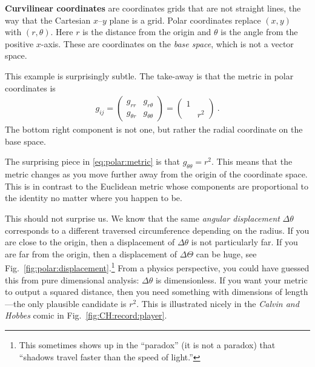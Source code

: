 \documentclass[12pt, oneside]{report}    %
\begin{document}
\textbf{Curvilinear coordinates} are coordinates grids that are not straight lines, the way that the Cartesian $x$--$y$ plane is a grid. Polar coordinates replace $(x,y)$ with $(r,\theta)$. Here $r$ is the distance from the origin and $\theta$ is the angle from the positive $x$-axis. These are coordinates on the \emph{base space}, which is not a vector space.
 
This example is surprisingly subtle. The take-away is that the metric in polar coordinates is
\begin{align}
    g_{ij} = 
    \begin{pmatrix}
        g_{rr} & g_{r\theta} \\
        g_{\theta r} & g_{\theta\theta}    
    \end{pmatrix}
    =
    \begin{pmatrix}
        1 & \\
        & r^2
    \end{pmatrix} \ .
    \label{eq:polar:metric}
\end{align}
The bottom right component is not one, but rather the radial coordinate on the base space. 

The surprising piece in \eqref{eq:polar:metric} is that $g_{\theta\theta} = r^2$. This means that the metric changes as you move further away from the origin of the coordinate space. This is in contrast to the Euclidean metric whose components are proportional to the identity no matter where you happen to be.

This should not surprise us. We know that the same \emph{angular displacement} $\Delta \theta$ corresponds to a different traversed circumference depending on the radius. If you are close to the origin, then a displacement of $\Delta\theta$ is not particularly far. If you are far from the origin, then a displacement of $\Delta\Theta$ can be huge, see Fig.~\ref{fig:polar:displacement}.\footnote{This sometimes shows up in the ``paradox'' (it is not a paradox) that ``shadows travel faster than the speed of light.''} From a physics perspective, you could have guessed this from pure dimensional analysis: $\Delta \theta$ is dimensionless. If you want your metric to output a squared distance, then you need something with dimensions of length---the only plausible candidate is $r^2$. This is illustrated nicely in the \emph{Calvin and Hobbes} comic in Fig.~\ref{fig:CH:record:player}.
\end{document}
